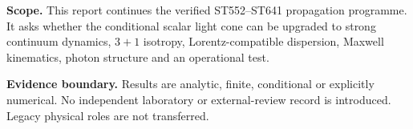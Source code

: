 \documentclass[11pt,a4paper]{article}
\begin{document}
\hypersetup{pageanchor=false}
\begin{titlepage}\centering\vspace*{14mm}{\Huge\bfseries FIN ST642--ST731\par}\vfill
\begin{minipage}{.91\textwidth}\small\textbf{Scope.} This report continues the verified ST552--ST641 propagation programme. It asks whether the conditional scalar light cone can be upgraded to strong continuum dynamics, $3+1$ isotropy, Lorentz-compatible dispersion, Maxwell kinematics, photon structure and an operational test.

\medskip\textbf{Evidence boundary.} Results are analytic, finite, conditional or explicitly numerical. No independent laboratory or external-review record is introduced. Legacy physical roles are not transferred.\end{minipage}\vfill\end{titlepage}\hypersetup{pageanchor=true}
\end{document}
